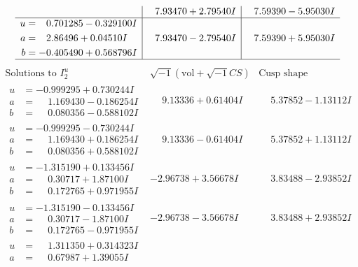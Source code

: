 \documentclass[1p]{elsarticle_modified}
\theoremstyle{definition}
\newcommand{\I}{\sqrt{-1}}
\begin{document}
$$\begin{array}{c|c|c}
 & \phantom{-}7.93470 + 2.79540 I & \phantom{-}7.59390 - 5.95030 I \\ \hline\begin{aligned}
u &= \phantom{-}0.701285 - 0.329100 I \\
a &= \phantom{-}2.86496 + 0.04510 I \\
b &= -0.405490 + 0.568796 I\end{aligned}
 & \phantom{-}7.93470 - 2.79540 I & \phantom{-}7.59390 + 5.95030 I\\
 \hline 
 \end{array}$$\newpage$$\begin{array}{c|c|c}  
\text{Solutions to }I^u_{2}& \I (\text{vol} + \sqrt{-1}CS) & \text{Cusp shape}\\
 \hline 
\begin{aligned}
u &= -0.999295 + 0.730244 I \\
a &= \phantom{-}1.169430 - 0.186254 I \\
b &= \phantom{-}0.080356 - 0.588102 I\end{aligned}
 & \phantom{-}9.13336 + 0.61404 I & \phantom{-}5.37852 - 1.13112 I \\ \hline\begin{aligned}
u &= -0.999295 - 0.730244 I \\
a &= \phantom{-}1.169430 + 0.186254 I \\
b &= \phantom{-}0.080356 + 0.588102 I\end{aligned}
 & \phantom{-}9.13336 - 0.61404 I & \phantom{-}5.37852 + 1.13112 I \\ \hline\begin{aligned}
u &= -1.315190 + 0.133456 I \\
a &= \phantom{-}0.30717 + 1.87100 I \\
b &= \phantom{-}0.172765 + 0.971955 I\end{aligned}
 & -2.96738 + 3.56678 I & \phantom{-}3.83488 - 2.93852 I \\ \hline\begin{aligned}
u &= -1.315190 - 0.133456 I \\
a &= \phantom{-}0.30717 - 1.87100 I \\
b &= \phantom{-}0.172765 - 0.971955 I\end{aligned}
 & -2.96738 - 3.56678 I & \phantom{-}3.83488 + 2.93852 I \\ \hline\begin{aligned}
u &= \phantom{-}1.311350 + 0.314323 I \\
a &= \phantom{-}0.67987 + 1.39055 I \\

\end{aligned}
\end{array}$$
\end{document}
